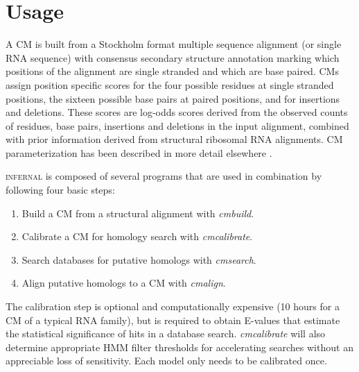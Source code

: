 \section{Usage} 

A CM is built from a Stockholm format \citep{infguide03} multiple
sequence alignment (or single RNA sequence) with consensus secondary
structure annotation marking which positions of the alignment are
single stranded and which are base paired. CMs assign position
specific scores for the four possible residues at single stranded
positions, the sixteen possible base pairs at paired positions, and
for insertions and deletions. These scores are log-odds scores derived
from the observed counts of residues, base pairs, insertions and
deletions in the input alignment, combined with prior information
derived from structural ribosomal RNA alignments.  CM parameterization
has been described in more detail elsewhere
\citep{Eddy94,Eddy02b,infguide03,NawrockiEddy07}.

\textsc{infernal} is composed of several programs that are used in
combination by following four basic steps: 

\begin{enumerate}
\item Build a CM from a structural alignment with \emph{cmbuild}.
\item Calibrate a CM for homology search with \emph{cmcalibrate}.
\item Search databases for putative homologs with \emph{cmsearch}.
\item Align putative homologs to a CM with \emph{cmalign}.
\end{enumerate}

The calibration step is optional and computationally expensive (10
hours for a CM of a typical RNA family), but is required to obtain
E-values that estimate the statistical significance of hits in a
database search. \emph{cmcalibrate} will also determine appropriate
HMM filter thresholds for accelerating searches without an appreciable
loss of sensitivity. Each model only needs to be calibrated once.


